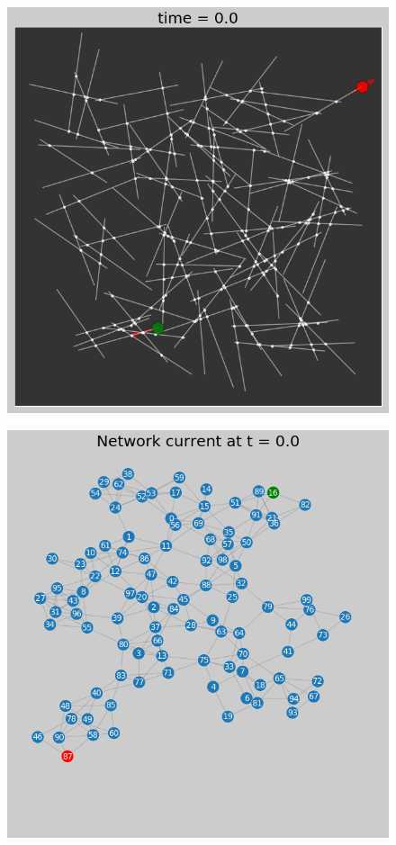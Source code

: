 \documentclass[fleqn,10pt,  amsmath,amssymb,aps]{wlscirep}
\begin{document}
\begin{figure}[h]
	\centering
	\includegraphics[width=0.8\linewidth]{figure/mpl_plot}
	\caption{}
	\label{fig:mpl_plot}
\end{figure}

\begin{figure}[h]
	\centering
	\includegraphics[width=0.8\linewidth]{figure/graph_plot}
	\caption{}
	\label{fig:graph_plot}
\end{figure}
\end{document}
